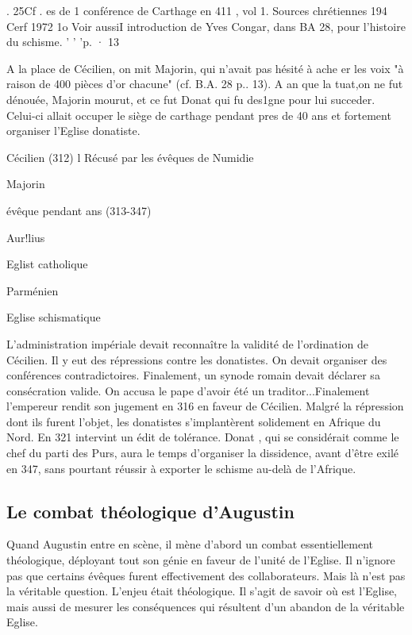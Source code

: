 .  25Cf .  es de 1  conférence de Carthage en 411 , vol 1. Sources chrétiennes 194  Cerf 1972	1o
Voir aussiI introduction de Yves Congar, dans BA 28, pour l'histoire du schisme.	'	'	'p.  ·
13
 

A la place de Cécilien, on mit Majorin, qui n'avait pas hésité  à ache er les voix "à raison de 400 pièces d'or chacune" (cf. B.A. 28 p.. 13).  A an que la  tuat,on ne fut dénouée, Majorin mourut, et ce fut  Donat qui fu des1gne pour lui succeder. Celui-ci allait occuper le siège de carthage pendant pres de 40 ans et fortement
organiser l'Eglise donatiste.

 
Cécilien (312)
l
Récusé par
les évêques de Numidie
 
Majorin



évêque pendant
ans (313-347)
 

 
Aur!lius

Eglist catholique
 
Parménien

Eglise schismatique
 

L'administration impériale devait reconnaître la validité de l'ordination de Cécilien. Il y eut des répressions contre les donatistes. On devait organiser des conférences contradictoires. Finalement, un synode romain devait déclarer sa consécration valide. On accusa le pape d'avoir été un traditor...Finalement l'empereur rendit son jugement en 316 en faveur de Cécilien. Malgré la répression dont ils furent l'objet, les donatistes s'implantèrent solidement en Afrique du Nord. En 321 intervint un édit de tolérance. Donat , qui se considérait comme le chef du parti des Purs, aura le temps d'organiser la dissidence, avant d'être exilé en 347, sans pourtant réussir à exporter le schisme au-delà de l'Afrique.
\subsection{Le combat théologique d'Augustin}
 

Quand Augustin entre en scène, il mène d'abord un combat essentiellement théologique, déployant tout son génie en faveur de l'unité de l'Eglise. Il n'ignore pas que certains évêques furent effectivement des collaborateurs. Mais là n'est pas la véritable question. L'enjeu était théologique. Il s'agit de savoir où est l'Eglise, mais aussi de mesurer les conséquences qui résultent d'un abandon de la véritable Eglise.

